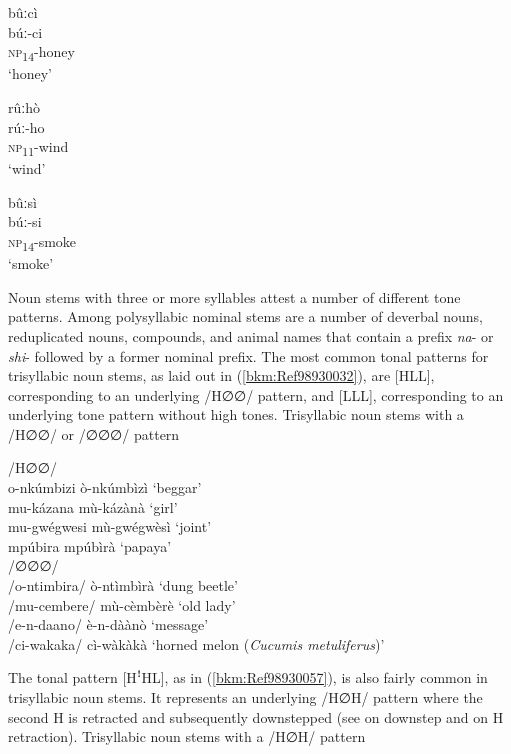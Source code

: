 \ea
\label{bkm:Ref451964135}
\glll bûːcì\\
búː-ci\\
\textsc{np}\textsubscript{14}-honey\\
\glt ‘honey’
\z

\ea
\glll rûːhò\\
rúː-ho\\
\textsc{np}\textsubscript{11}-wind\\
\glt ‘wind’
\z

\ea
\label{bkm:Ref451964136}
\glll bûːsì\\
búː-si\\
\textsc{np}\textsubscript{14}-smoke\\
\glt ‘smoke’
\z

Noun stems with three or more syllables attest a number of different tone patterns. Among polysyl\-labic nominal stems are a number of deverbal nouns, reduplicated nouns, compounds, and animal names that contain a prefix \textit{na}- or \textit{shi}- followed by a former nominal prefix. The most common tonal patterns for trisyllabic noun stems, as laid out in (\ref{bkm:Ref98930032}), are [HLL], corresponding to an under\-lying /H∅∅/ pattern, and [LLL], corresponding to an underlying tone pattern without high tones.
\ea
\label{bkm:Ref98930032}
  Trisyllabic noun stems with a /H∅∅/ or /∅∅∅/ pattern

\ea
/H∅∅/ \tab [HLL] \\
o-nkúmbizi \tab ò-nkúmbìzì \tab ‘beggar’\\
mu-kázana \tab mù-kázànà \tab ‘girl’\\
mu-gwégwesi \tab mù-gwégwèsì \tab ‘joint’\\
mpúbira \tab mpúbìrà \tab ‘papaya’\\
\ex
/∅∅∅/ \tab [LLL] \tab \\
/o-ntimbira/ \tab ò-ntìmbìrà \tab ‘dung beetle’\\
/mu-cembere/ \tab mù-cèmbèrè \tab ‘old lady’\\
/e-n-daano/ \tab è-n-dàànò \tab ‘message’\\
/ci-wakaka/ \tab cì-wàkàkà \tab ‘horned melon (\textit{Cucumis metuliferus})’\\

\z
\z

The tonal pattern [HꜝHL], as in (\ref{bkm:Ref98930057}), is also fairly common in trisyllabic noun stems. It represents an under\-lying /H∅H/ pattern where the second H is retracted and subsequently downstepped (see  on downstep and  on H retraction).
\ea
\label{bkm:Ref98930057}
  Trisyllabic noun stems with a /H∅H/ pattern


